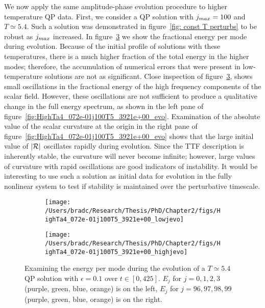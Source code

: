 \documentclass[../PhD.tex]{subfiles}
\begin{document}
We now apply the same amplitude-phase evolution procedure to higher temperature QP data. First, we consider a QP solution with $j_{max} = 100$ and $T \simeq 5.4$. Such a solution was demonstrated in figure~\ref{fig: const T perturbs} to be robust as $j_{max}$ increased. In figure~\ref{fig: HighTa4_072e-01j100T5_3921e+00_highjevo} we show  the fractional energy per mode during evolution. Because of the initial profile of solutions with these temperatures, there is a much higher fraction of the total energy in the higher modes; therefore, the accumulation of numerical errors that were present in low-temperature solutions are not as significant. Close inspection of figure~\ref{fig: HighTa4_072e-01j100T5_3921e+00_highjevo}, shows small oscillations in the fractional energy of the high frequency components of the scalar field. However, these oscillations are not sufficient to produce a qualitative change in the full energy spectrum, as shown in the left pane of figure~\ref{fig:HighTa4_072e-01j100T5_3921e+00_evo}. Examination of the absolute value of the scalar curvature at the origin in the right pane of figure~\ref{fig:HighTa4_072e-01j100T5_3921e+00_evo} shows that the large initial value of $| \mathcal R |$ oscillates rapidly during evolution. Since the TTF description is inherently stable, the curvature will never become infinite; however, large values of curvature with rapid oscillations are good indicators of instability. It would be interesting to use such a solution as initial data for evolution in the fully nonlinear system to test if stability is maintained over the perturbative timescale. 
\vspace{0.1in}
\begin{figure}[H]
	\centering
	\begin{subfigure}[t]{0.48\textwidth}
		\texttt{[image: /Users/bradc/Research/Thesis/PhD/Chapter2/figs/HighTa4\_072e-01j100T5\_3921e+00\_lowjevo]}
		\label{}
	\end{subfigure}
	\hfill
	\begin{subfigure}[t]{0.48\textwidth}
		\texttt{[image: /Users/bradc/Research/Thesis/PhD/Chapter2/figs/HighTa4\_072e-01j100T5\_3921e+00\_highjevo]}
		\label{}
	\end{subfigure}
	\caption[Examining the energy per mode during the evolution of a $T \simeq 5.4$ QP solution]{Examining the energy per mode during the evolution of a $T \simeq 5.4$ QP solution with ${\epsilon = 0.1}$ over ${t \in [0, 425]}$. $E_j$ for ${j = 0, 1, 2, 3}$ (purple, green, blue, orange) is on the left,  $E_j$ for ${j = 96, 97, 98, 99}$ (purple, green, blue, orange) is on the right.}
	\label{fig: HighTa4_072e-01j100T5_3921e+00_highjevo}
\end{figure}
	
\end{document}
